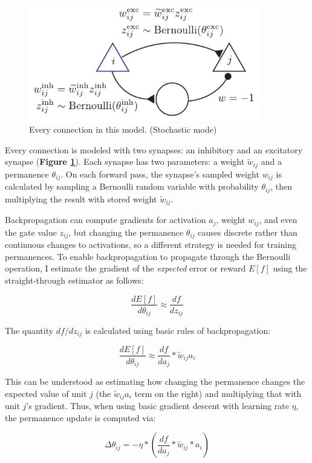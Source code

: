 \documentclass[11pt]{article}
\begin{document}
\begin{figure}[htbp]
\centering
\includegraphics[width=4in]{./figures/model.pdf}
\caption{Every connection in this model. (Stochastic mode) \label{fig:model}}
\end{figure}

Every connection is modeled with two synapses: an inhibitory and an excitatory synapse (\textbf{Figure \ref{fig:model}}). Each synapse has two parameters: a weight \(\tilde{w}_{ij}\) and a permanence \(\theta_{ij}\). On each forward pass, the synapse's sampled weight \(w_{ij}\) is calculated by sampling a Bernoulli random variable with probability \(\theta_{ij}\), then multiplying the result with stored weight \(\tilde{w}_{ij}\).

Backpropagation can compute gradients for activation \(a_j\), weight \(w_{ij}\), and even the gate value \(z_{ij}\), but changing the permanence \(\theta_{ij}\) causes discrete rather than continuous changes to activations, so a different strategy is needed for training permanences. To enable backpropagation to propagate through the Bernoulli operation, I estimate the gradient of the \emph{expected} error or reward \(E\left[f\right]\) using the straight-through estimator \citep{bengio2013estimating} as follows:

$$
\frac{dE[f]}{d\theta_{ij}} \approx \frac{df}{dz_{ij}}
$$

The quantity \(df/dz_{ij}\) is calculated using basic rules of backpropagation:

$$
\frac{dE[f]}{d\theta_{ij}} \approx \frac{df}{da_j} * \tilde{w}_{ij} a_i
$$

This can be understood as estimating how changing the permanence changes the expected value of unit \(j\) (the \(\tilde{w}_{ij} a_i\) term on the right) and multiplying that with unit \(j\)'s gradient. Thus, when using basic gradient descent with learning rate \(\eta\), the permanence update is computed via:

$$
\Delta\theta_{ij} = -\eta * \left( \frac{df}{da_j} * \tilde{w}_{ij} * a_i \right)
$$
\end{document}
